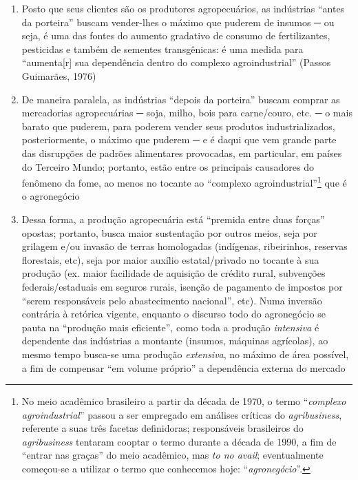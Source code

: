 \documentclass[12pt]{article}
\numberwithin{equation}{section}
\theoremstyle{plain}
\theoremstyle{definition}
\theoremstyle{remark}
\begin{document}
\begin{enumerate}
\def\labelenumi{\arabic{enumi}.}
\tightlist
\item
  Posto que seus clientes são os produtores agropecuários, as indústrias ``antes da porteira'' buscam vender-lhes o máximo que puderem de insumos ─ ou seja, é uma das fontes do aumento gradativo de consumo de fertilizantes, pesticidas e também de sementes transgênicas: é uma medida para ``aumenta{[}r{]} sua dependência dentro do complexo agroindustrial'' (Passos Guimarães, 1976)
\item
  De maneira paralela, as indústrias ``depois da porteira'' buscam comprar as mercadorias agropecuárias ─ soja, milho, bois para carne/couro, etc. ─ o mais barato que puderem, para poderem vender seus produtos industrializados, posteriormente, o máximo que puderem ─ e é daqui que vem grande parte das disrupções de padrões alimentares provocadas, em particular, em países do Terceiro Mundo; portanto, estão entre os principais causadores do fenômeno da fome, ao menos no tocante ao ``complexo agroindustrial''\footnote{No meio acadêmico brasileiro a partir da década de 1970, o termo ``\textit{complexo agroindustrial}'' passou a ser empregado em análises críticas do \textit{agribusiness}, referente a suas três facetas definidoras; responsáveis brasileiros do \textit{agribusiness} tentaram cooptar o termo durante a década de 1990, a fim de ``entrar nas graças'' do meio acadêmico, mas \textit{to no avail}; eventualmente começou-se a utilizar o termo que conhecemos hoje: ``\textit{agronegócio}''.} que é o agronegócio
\item
  Dessa forma, a produção agropecuária está ``premida entre duas forças'' opostas; portanto, busca maior sustentação por outros meios, seja por grilagem e/ou invasão de terras homologadas (indígenas, ribeirinhos, reservas florestais, etc), seja por maior auxílio estatal/privado no tocante à sua produção (ex. maior facilidade de aquisição de crédito rural, subvenções federais/estaduais em seguros rurais, isenção de pagamento de impostos por ``serem responsáveis pelo abastecimento nacional'', etc). Numa inversão contrária à retórica vigente, enquanto o discurso todo do agronegócio se pauta na ``produção mais eficiente'', como toda a produção \textit{intensiva} é dependente das indústrias a montante (insumos, máquinas agrícolas), ao mesmo tempo busca-se uma produção \textit{extensiva}, no máximo de área possível, a fim de compensar ``em volume próprio'' a dependência externa do mercado
\end{enumerate}
\end{document}
